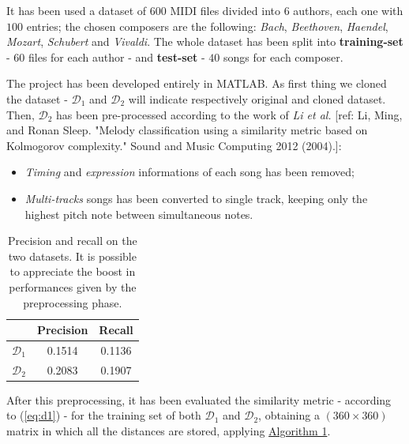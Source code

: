 \documentclass[a4paper]{article}
\begin{document}
	It has been used a dataset of $600$ MIDI files divided into $6$ authors, each one with $100$ entries; the chosen composers are the following: \textit{Bach}, \textit{Beethoven}, \textit{Haendel}, \textit{Mozart}, \textit{Schubert} and \textit{Vivaldi}. The whole dataset has been split into \textbf{training-set} - $60$ files for each author -  and \textbf{test-set} - $40$ songs for each composer. 
	
	The project has been developed entirely in MATLAB. As first thing we cloned the dataset - $\mathcal{D}_1$ and $\mathcal{D}_2$ will indicate respectively original and cloned dataset. Then, $\mathcal{D}_2$ has been pre-processed according to the work of \textit{Li et al.} [ref: Li, Ming, and Ronan Sleep. "Melody classification using a similarity metric based on Kolmogorov complexity." Sound and Music Computing 2012 (2004).]:
	\begin{itemize}
		\item \textit{Timing} and \textit{expression} informations of each song has been removed;
		\item \textit{Multi-tracks} songs has been converted to single track, keeping only the highest pitch note between simultaneous notes.
	\end{itemize}
	
	\begin{table}[!h]
		\centering
		\label{tab:stats}
		\begin{tabular}{| c | c | c |}
			\hline
			& Precision & Recall \\ \hline
			$\mathcal{D}_1$ & 0.1514 & 0.1136 \\ 
			$\mathcal{D}_2$ & 0.2083 & 0.1907 \\ 
			\hline
		\end{tabular}
		\caption{Precision and recall on the two datasets. It is possible to appreciate the boost in performances given by the preprocessing phase.}
	\end{table}
	
	After this preprocessing, it has been evaluated the similarity metric - according to (\ref{eq:d1}) - for the training set of both $\mathcal{D}_1$ and $\mathcal{D}_2$, obtaining a $(360 \times 360)$ matrix in which all the distances are stored, applying \hyperref[alg_1]{Algorithm 1}.
	
\end{document}

